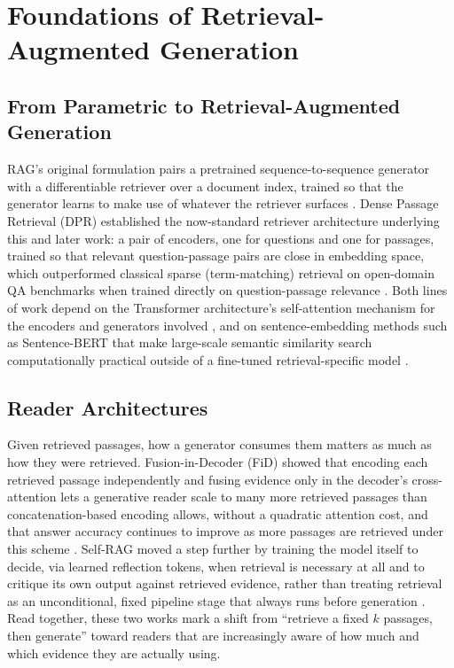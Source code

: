 \documentclass[conference]{IEEEtran}
\begin{document}
\section{Foundations of Retrieval-Augmented Generation}

\subsection{From Parametric to Retrieval-Augmented Generation}
RAG's original formulation pairs a pretrained sequence-to-sequence
generator with a differentiable retriever over a document index, trained
so that the generator learns to make use of whatever the retriever
surfaces \cite{lewis2020rag}. Dense Passage Retrieval (DPR) established
the now-standard retriever architecture underlying this and later work: a
pair of encoders, one for questions and one for passages, trained so that
relevant question-passage pairs are close in embedding space, which
outperformed classical sparse (term-matching) retrieval on open-domain QA
benchmarks when trained directly on question-passage relevance
\cite{karpukhin2020dpr}. Both lines of work depend on the Transformer
architecture's self-attention mechanism for the encoders and generators
involved \cite{vaswani2017attention}, and on sentence-embedding methods
such as Sentence-BERT that make large-scale semantic similarity search
computationally practical outside of a fine-tuned retrieval-specific
model \cite{reimers2019sbert}.

\subsection{Reader Architectures}
Given retrieved passages, how a generator consumes them matters as much
as how they were retrieved. Fusion-in-Decoder (FiD) showed that encoding
each retrieved passage independently and fusing evidence only in the
decoder's cross-attention lets a generative reader scale to many more
retrieved passages than concatenation-based encoding allows, without a
quadratic attention cost, and that answer accuracy continues to improve
as more passages are retrieved under this scheme \cite{izacard2021fid}.
Self-RAG moved a step further by training the model itself to decide,
via learned reflection tokens, when retrieval is necessary at all and to
critique its own output against retrieved evidence, rather than treating
retrieval as an unconditional, fixed pipeline stage that always runs
before generation \cite{asai2024selfrag}. Read together, these two works
mark a shift from ``retrieve a fixed $k$ passages, then generate'' toward
readers that are increasingly aware of how much and which evidence they
are actually using.
\end{document}
